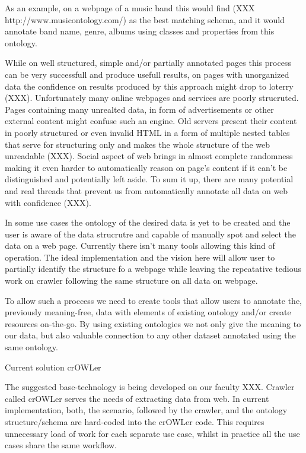 As an example, on a webpage of a music band this would find (XXX
http://www.musicontology.com/) as the best matching schema, and it would
annotate band name, genre, albums using classes and  properties from this ontology. 

While on well structured, simple and/or partially annotated pages this process
can be very successfull and produce usefull results, on pages with unorganized
data the confidence on results produced by this approach might drop to loterry (XXX). 
Unfortunately many online webpages and services are poorly strucruted. Pages
containing many unrealted data, in form of advertisements or other external
content might confuse such an engine. Old servers present their content in
poorly structured or even invalid HTML in a form of multiple nested tables that
serve for structuring only and makes the whole structure of the web unreadable
(XXX). Social aspect of web brings in almost complete randomness making it
even harder to automatically reason on page's content if it can't be
distinguished and potentially left aside. To sum it up, there are many
potential and real threads that prevent us from automatically annotate all data
on web with confidence (XXX). 

In some use cases the ontology of the desired data is yet to be created and the
user is aware of the data strucrutre and capable of manually spot and select
the data on a web page. Currently there isn't many tools allowing this kind of
operation. The ideal implementation and the vision here will allow user to
partially identify the structure fo a webpage while leaving the repeatative
tedious work on crawler following the same structure on all data on webpage. 

To allow such a proccess we need to create tools that allow users to annotate
the, previously meaning-free, data with elements of existing ontology and/or
create resources on-the-go. By using existing ontologies we not only give the
meaning to our data, but also valuable connection to any other dataset
annotated using the same ontology. 


\sec Current solution crOWLer

The suggested base-technology is being developed on our faculty XXX. Crawler
called crOWLer serves the needs of extracting data from web. In current
implementation, both, the scenario, followed by the crawler, and the ontology
structure/schema are hard-coded into the crOWLer code. This requires
unnecessary load of work for each separate use case, whilst in practice all the
use cases share the same workflow. 

